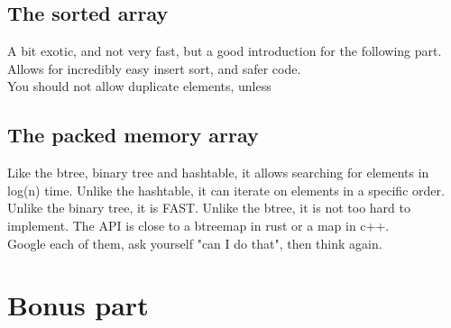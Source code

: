 \documentclass{42-en}
\begin{document}
    \section{The sorted array}
    A bit exotic, and not very fast, but a good introduction for the following part.
    Allows for incredibly easy insert sort, and safer code.\\
    You should not allow duplicate elements, unless 

    \section{The packed memory array}
    Like the btree, binary tree and hashtable, it allows searching
    for elements in log(n) time. Unlike the hashtable, it can iterate on elements in
    a specific order. Unlike the binary tree, it is FAST. Unlike the btree,
    it is not too hard to implement. The API is close to a btreemap in rust or a map in c++.\\

    Google each of them, ask yourself "can I do that", then think again.\\




\chapter{Bonus part}
\end{document}
